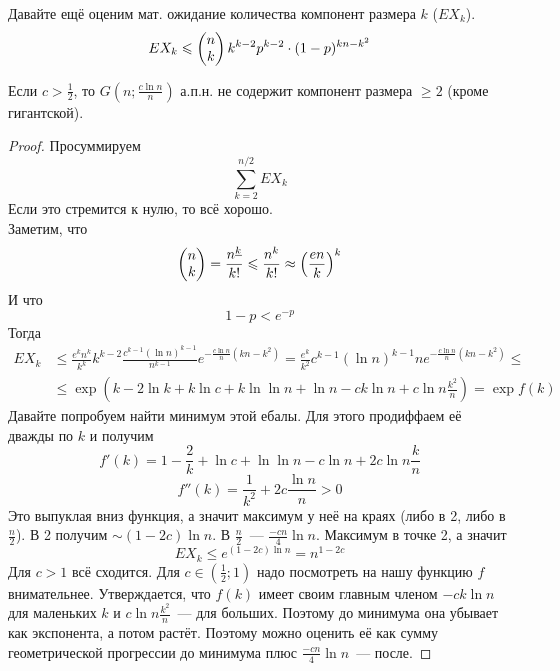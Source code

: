 \documentclass{article}
\begin{document}
    \begin{remark}
        Давайте ещё оценим мат. ожидание количества компонент размера $k$ ($EX_k$).
        $$
        EX_k\leqslant\left(\begin{matrix}n\\k\end{matrix}\right)k^{k-2}p^{k-2}\cdot(1-p)^{kn-k^2}
        $$
    \end{remark}
    \begin{theorem}
        Если $c>\frac12$, то $G(n;\frac{c\ln n}n)$ а.п.н. не содержит компонент размера $\geqslant 2$ (кроме гигантской).
    \end{theorem}
    \begin{proof}
        Просуммируем
        $$
        \sum\limits_{k=2}^{n/2}EX_k
        $$
        Если это стремится к нулю, то всё хорошо.\\
        Заметим, что
        $$
        \left(\begin{matrix}n\\k\end{matrix}\right)=\frac{n^{\underline k}}{k!}\leqslant\frac{n^k}{k!}\approx\left(\frac{en}k\right)^k
        $$
        И что
        $$
        1-p<e^{-p}
        $$
        Тогда
        \[\begin{split}
            EX_k&\leqslant\frac{e^kn^k}{k^k}k^{k-2}\frac{c^{k-1}(\ln n)^{k-1}}{n^{k-1}}e^{-\frac{c\ln n}n(kn-k^2)}=\frac{e^k}{k^2}c^{k-1}(\ln n)^{k-1}ne^{-\frac{c\ln n}n(kn-k^2)}\leqslant\\
            &\leqslant\exp\left(k-2\ln k+k\ln c+k\ln\ln n+\ln n-ck\ln n+c\ln n\frac{k^2}n\right)=\exp f(k)
        \end{split}\]
        Давайте попробуем найти минимум этой ебалы. Для этого продиффаем её дважды по $k$ и получим
        $$
        f'(k)=1-\frac2k+\ln c+\ln\ln n-c\ln n+2c\ln n\frac kn
        $$
        $$
        f''(k)=\frac1{k^2}+2c\frac{\ln n}n>0
        $$
        Это выпуклая вниз функция, а значит максимум у неё на краях (либо в 2, либо в $\frac n2$). В 2 получим $\sim(1-2c)\ln n$. В $\frac n2$~--- $\frac{-cn}4\ln n$. Максимум в точке 2, а значит
        $$
        EX_k\leqslant e^{(1-2c)\ln n}=n^{1-2c}
        $$
        Для $c>1$ всё сходится. Для $c\in\left(\frac12;1\right)$ надо посмотреть на нашу функцию $f$ внимательнее. Утверждается, что $f(k)$ имеет своим главным членом $-ck\ln n$ для маленьких $k$ и $c\ln n\frac{k^2}n$~--- для больших. Поэтому до минимума она убывает как экспонента, а потом растёт. Поэтому можно оценить её как сумму геометрической прогрессии до минимума плюс $\frac{-cn}4\ln n$~--- после.
    \end{proof}
\end{document}
